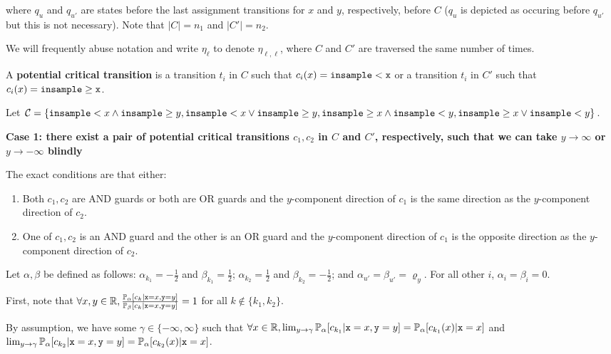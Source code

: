 where $q_u$ and $q_{u'}$ are states before the last assignment transitions for $x$ and $y$, respectively, before $C$ ($q_u$ is depicted as occuring before $q_{u'}$ but this is not necessary). Note that $|C| = n_1$ and $|C'| = n_2$.

We will frequently abuse notation and write $\eta_\ell$ to denote $\eta_{\ell, \ell}$, where $C$ and $C'$ are traversed the same number of times. 

 

\begin{defn}
	A \textbf{potential critical transition} is a transition $t_i$ in $C$ such that $c_i(x) = \lguard[\texttt{x}]$ or a transition $t_i$ in $C'$ such that $c_i(x) = \gguard[\texttt{x}]$.
\end{defn}


Let $\mathcal{C} = \{\lguard[x]\land\gguard[y], \lguard[x]\lor \gguard[y], \gguard[x]\land\lguard[y], \gguard[x]\lor\lguard[y]\}$.

\textbf{Case 1: there exist a pair of potential critical transitions $c_1, c_2$ in $C$ and $C'$, respectively, such that we can take $y\to\infty$ or $y\to-\infty$ blindly}

The exact conditions are that either: \begin{enumerate}
	\item Both $c_1, c_2$ are AND guards or both are OR guards and the $y$-component direction of $c_1$ is the same direction as the $y$-component direction of $c_2$.
	\item One of $c_1, c_2$ is an AND guard and the other is an OR guard and the $y$-component direction of $c_1$ is the opposite direction as the $y$-component direction of $c_2$.
\end{enumerate}

Let $\alpha, \beta$ be defined as follows: $\alpha_{k_1} = -\frac{1}{2}$ and $\beta_{k_1} = \frac{1}{2}$; $\alpha_{k_2} = \frac{1}{2}$ and $\beta_{k_2} = -\frac{1}{2}$; and $\alpha_{u'} = \beta_{u'} =\varrho_y$. For all other $i$, $\alpha_i = \beta_i = 0$. 

First, note that $\forall x, y\in \RR, \frac{\PP_\alpha[c_k|\texttt{x}=x, \texttt{y}=y]}{\PP_\beta[c_k|\texttt{x}=x, \texttt{y}=y]} = 1$ for all $k\notin \{k_1, k_2\}$.


By assumption, we have some $\gamma\in \{-\infty, \infty\}$ such that $\forall x\in \RR, \lim_{y\to\gamma}\PP_\alpha[c_{k_1}|\texttt{x}=x, \texttt{y}=y] = \PP_\alpha[c_{k_1}(x)|\texttt{x}=x]$ and $\lim_{y\to\gamma}\PP_\alpha[c_{k_2}|\texttt{x}=x, \texttt{y}=y] = \PP_\alpha[c_{k_2}(x)|\texttt{x}=x]$.

